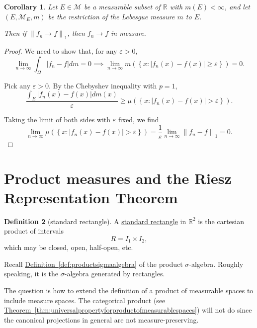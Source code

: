 \documentclass[a4paper,12pt]{scrreprt}
\newcommand{\R}{\mathbb{R}}
\newcommand{\defn}[1]{\ul{#1}}
\newcommand{\norm}[1]{\left\|#1\right\|}
\newcommand{\abs}[1]{\left|#1\right|}
\theoremstyle{definition}
\newtheorem{definition}{Definition}
\theoremstyle{plain}
\newtheorem{corollary}[definition]{Corollary}
\theoremstyle{remark}
\begin{document}
\begin{corollary}
  Let $E \in \mathcal{M}$ be a measurable subset of $\R$ with $m(E) < \infty$, and let $(E, \mathcal{M}_{E}, m)$ be the restriction of the Lebesgue measure $m$ to $E$.

  Then if $\norm{f_{n} \to f}_{1}$, then $f_{n} \to f$ in measure.
\end{corollary}
\begin{proof}
  We need to show that, for any $\varepsilon > 0$,
  \begin{equation*}
    \lim_{n \to \infty} \int_{\Omega} \abs{f_{n} - f} dm = 0 \implies \lim_{n \to \infty} m\left( \left\{ x\colon \abs{f_{n}(x) - f(x)} \geq \varepsilon \right\} \right) = 0.
  \end{equation*}

  Pick any $\varepsilon > 0$. By the Chebyshev inequality with $p=1$,
  \begin{equation*}
    \frac{\int_{E} \abs{f_{n}(x) - f(x)} dm(x)}{\varepsilon} \geq \mu\left( \left\{ x\colon \abs{f_{n}(x) - f(x)} > \varepsilon \right\} \right).
  \end{equation*}

  Taking the limit of both sides with $\varepsilon$ fixed, we find
  \begin{equation*}
    \lim_{n \to \infty} \mu\left( \left\{ x\colon \abs{f_{n}(x) - f(x)} > \varepsilon \right\} \right) = \frac{1}{\varepsilon} \lim_{n \to \infty} \norm{f_{n} - f}_{1} = 0.
  \end{equation*}
\end{proof}

\section{Product measures and the Riesz Representation Theorem}
\begin{definition}[standard rectangle]
  \label{def:standardrectangle}
  A \defn{standard rectangle} in $\R^{2}$ is the cartesian product of intervals
  \begin{equation*}
    R = I_{1} \times I_{2},
  \end{equation*}
  which may be closed, open, half-open, etc.
\end{definition}

Recall \hyperref[def:productsigmaalgebra]{Definition~\ref*{def:productsigmaalgebra}} of the product $\sigma$-algebra. Roughly speaking, it is the $\sigma$-algebra generated by rectangles.

The question is how to extend the definition of a product of measurable spaces to include measure spaces. The categorical product (see \hyperref[thm:universalpropertyforproductofmeasurablespaces]{Theorem~\ref*{thm:universalpropertyforproductofmeasurablespaces}}) will not do since the canonical projections in general are not measure-preserving.
\end{document}
